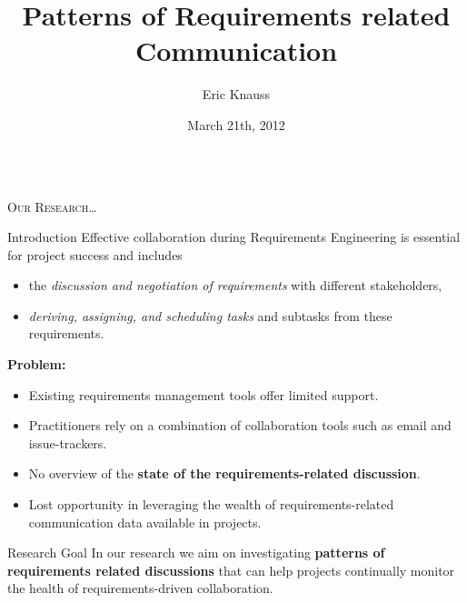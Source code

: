 \documentclass[final]{beamer} %
\title[Requirements Patterns]{Patterns of Requirements related Communication}
\author[Knauss]{Eric Knauss}
\institute[University of Victoria]{University of Victoria, Canada}
\date{March 21th, 2012}
\newcommand{\marker}[1]{\textbf{\color{knaccentcolor1} #1}}
\begin{document}
  
\begin{frame}{} 
\vspace{-1cm}
\begin{columns}[t]

  \begin{column}{.45\linewidth}
  
  {\Large  \color{white} \textsc{Our Research\ldots}}
  
    \begin{block}{Introduction}
Effective collaboration during Requirements Engineering is essential for project success and %
includes 
\begin{itemize}
\item the \emph{discussion and negotiation of requirements} with different stakeholders,
\item \emph{deriving, assigning, and scheduling tasks} and subtasks from these requirements. 
\end{itemize}

\textbf{Problem:} 
\begin{itemize}
\item Existing requirements management tools offer limited support.
\item Practitioners rely on a combination of collaboration tools such as email and issue-trackers. 
\item No overview of the  \marker{state of the requirements-related discussion}.
\item Lost opportunity in leveraging the wealth of requirements-related communication data available in projects.
\end{itemize}
    \end{block}
    
    \vspace{2\columnsep}
    
    \begin{block}{Research Goal}
     In our research we aim on investigating \marker{patterns of requirements related discussions} that can help projects continually monitor the health of requirements-driven collaboration. 
     
    \end{block}
    
    \vspace{2\columnsep}
    

\end{column}
\end{columns}
\end{frame}
\end{document}

